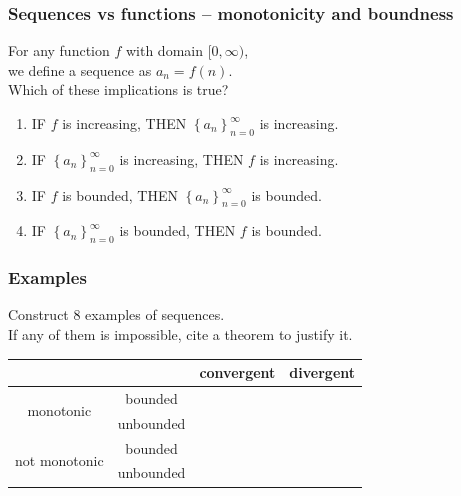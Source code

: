 \begin{frame}[t]
	\frametitle{Sequences vs functions -- monotonicity and boundness}

	For any function $f$ with domain $[0, \infty)$, \\ we define a sequence as $a_{n}
	= f(n)$. \\ Which of these implications is true?

	\begin{enumerate}
		\item IF $f$ is increasing, THEN
			$\displaystyle \left\{ a_{n} \right\}_{n=0}^{\infty}$ is increasing.
			\vfill

		\item IF $\displaystyle \left\{ a_{n} \right\}_{n=0}^{\infty}$ is increasing,
			THEN $f$ is increasing.
			\vfill

		\item IF $f$ is bounded, THEN
			$\displaystyle \left\{ a_{n} \right\}_{n=0}^{\infty}$ is bounded.
			\vfill

		\item IF $\displaystyle \left\{ a_{n} \right\}_{n=0}^{\infty}$ is bounded,
			THEN $f$ is bounded.
			\vfill
	\end{enumerate}
\end{frame}

\begin{frame}[t]
	\fontsize{13}{13}\selectfont
	\frametitle{Examples}

	Construct 8 examples of sequences. \\ If any of them is impossible, cite a theorem
	to justify it.

	\begin{center}
		\begin{tabular}{|c|c|c|c|}
			\hline
			                               &           & convergent                                               & divergent                                                \\
			\hline
			\multirow{2}{*}{monotonic}     & bounded   & \phantom{$\displaystyle \int_{\dfrac 11}^{9}$ ???????? } & \phantom{$\displaystyle \int_{\dfrac 11}^{9}$ ???????? } \\
			\cline{2-4}                    & unbounded & \phantom{$\displaystyle \int_{\dfrac 11}^{9}$ ???????? } & \phantom{$\displaystyle \int_{\dfrac 11}^{9}$ ???????? } \\
			\hline
			\multirow{2}{*}{not monotonic} & bounded   & \phantom{$\displaystyle \int_{\dfrac 11}^{9}$ ???????? } & \phantom{$\displaystyle \int_{\dfrac 11}^{9}$ ???????? } \\
			\cline{2-4}                    & unbounded & \phantom{$\displaystyle \int_{\dfrac 11}^{9}$ ???????? } & \phantom{$\displaystyle \int_{\dfrac 11}^{9}$ ???????? } \\
			\hline
		\end{tabular}
	\end{center}
\end{frame}

